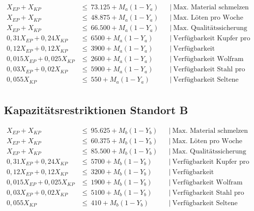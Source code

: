 \documentclass[a4paper,11pt]{article}
\begin{document}
\begin{align*}
X_{EP} + X_{KP} &\le ~ 73.125 + M_a(1-Y_a) && \big|~ \text{Max. Material schmelzen pro Woche} \\
X_{EP} + X_{KP} &\le ~ 48.875 + M_a(1-Y_a) && \big|~ \text{Max. Löten pro Woche} \\
X_{EP} + X_{KP} &\le ~ 66.500 + M_a(1-Y_a) && \big|~ \text{Max. Qualitätssicherung pro Woche} \\
0,31X_{EP} + 0,24X_{KP} &\le ~ 6500 + M_a(1-Y_a) && \big|~ \text{Verfügbarkeit Kupfer pro Woche} \\
0,12X_{EP} + 0,12X_{KP} &\le ~ 3900 + M_a(1-Y_a) && \big|~ \text{Verfügbarkeit Plastikplatinen pro Woche} \\
0,015X_{EP} + 0,025X_{KP} &\le ~ 2600 + M_a(1-Y_a) && \big|~ \text{Verfügbarkeit Wolfram pro Woche} \\
0,03X_{EP} + 0,02X_{KP} &\le ~ 5900 + M_a(1-Y_a) && \big|~ \text{Verfügbarkeit Stahl pro Woche} \\
0,055X_{KP} &\le ~ 550 + M_a(1-Y_a) && \big|~ \text{Verfügbarkeit Seltene Erden pro Woche} \\
\end{align*}

\subsection*{Kapazitätsrestriktionen Standort B}
\begin{align*}
X_{EP} + X_{KP} &\le ~ 95.625 + M_b(1-Y_b) && \big|~ \text{Max. Material schmelzen pro Woche} \\
X_{EP} + X_{KP} &\le ~ 60.375 + M_b(1-Y_b) && \big|~ \text{Max. Löten pro Woche} \\
X_{EP} + X_{KP} &\le ~ 85.500 + M_b(1-Y_b) && \big|~ \text{Max. Qualitätssicherung pro Woche} \\
0,31X_{EP} + 0,24X_{KP} &\le ~ 5700 + M_b(1-Y_b) && \big|~ \text{Verfügbarkeit Kupfer pro Woche} \\
0,12X_{EP} + 0,12X_{KP} &\le ~ 3200 + M_b(1-Y_b) && \big|~ \text{Verfügbarkeit Plastikplatinen pro Woche} \\
0,015X_{EP} + 0,025X_{KP} &\le ~ 1900 + M_b(1-Y_b) && \big|~ \text{Verfügbarkeit Wolfram pro Woche} \\
0,03X_{EP} + 0,02X_{KP} &\le ~ 5100 + M_b(1-Y_b) && \big|~ \text{Verfügbarkeit Stahl pro Woche} \\
0,055X_{KP} &\le ~ 410 + M_b(1-Y_b) && \big|~ \text{Verfügbarkeit Seltene Erden pro Woche} \\
\end{align*}
\end{document}
